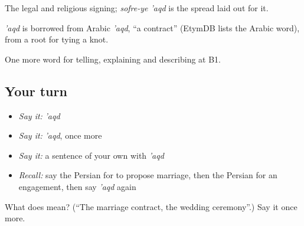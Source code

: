 The legal and religious signing; \emph{sofre-ye 'aqd} is the spread laid out for it.

\begin{cousinweb}
\emph{'aqd} is borrowed from Arabic \emph{'aqd}, \textquotedblleft{}a contract\textquotedblright{} (EtymDB lists the Arabic word), from a root for tying a knot.
\end{cousinweb}

\begin{grammarlens}[title={What you've built}]
One more word for telling, explaining and describing at B1.
\end{grammarlens}

\subsection*{Your turn}
\begin{itemize}
\raggedright
  \item \emph{Say it:} \emph{'aqd}
  \item \emph{Say it:} \emph{'aqd}, once more
  \item \emph{Say it:} a sentence of your own with \emph{'aqd}
  \item \emph{Recall:} say the Persian for to propose marriage, then the Persian for an engagement, then say \emph{'aqd} again
\end{itemize}

\begin{tcolorbox}[breakable,colback=teal!4,colframe=teal!35!black,title={Before you move on}]
What does  mean? (\textquotedblleft{}The marriage contract, the wedding ceremony\textquotedblright{}.) Say it once more.
\end{tcolorbox}
